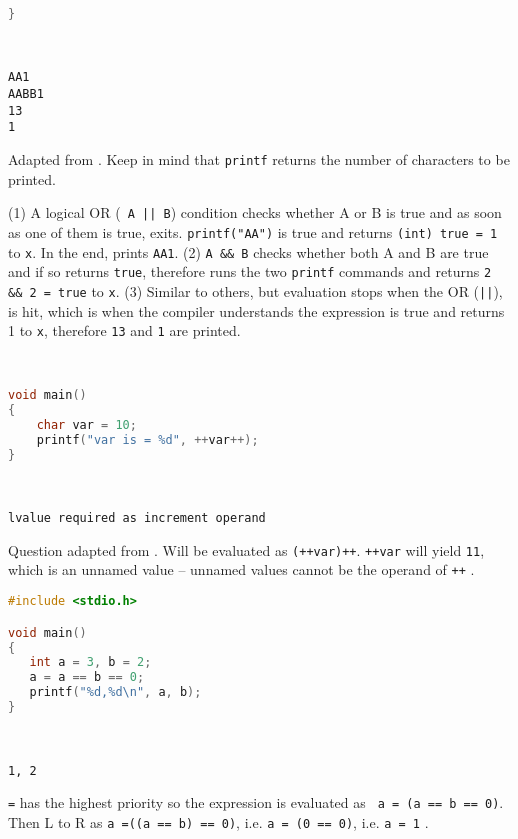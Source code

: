 \documentclass[a4paper]{article}
\begin{document}
\begin{exmp}
\begin{multicols}{2}
\begin{lstlisting}[language=c]
}
\end{lstlisting}


\columnbreak
\; \\
\begin{verbatim}
AA1
AABB1
13
1
\end{verbatim}

Adapted from \cite{aptitudequestions}. Keep in mind that \texttt{printf} returns the number of characters to be printed. 

(1) A logical OR (\texttt{ A || B}) condition checks whether A or B is true and as soon as one of them is true, exits. \texttt{printf("AA")} is true and returns \texttt{(int) true = 1} to \texttt{x}. In the end, prints \texttt{AA1}. (2) \texttt{A \&\& B} checks whether both A and B are true and if so returns \texttt{true}, therefore runs the two \texttt{printf} commands and returns \texttt{2 \&\& 2 = true} to \texttt{x}. (3) Similar to others, but evaluation stops when the OR (\texttt{||}), is hit, which is when the compiler understands the expression is true and returns 1 to \texttt{x}, therefore \texttt{13} and \texttt{1} are printed.
\end{multicols}



\begin{multicols}{2}


\begin{lstlisting}[language=c]


void main()
{   
	char var = 10;
	printf("var is = %d", ++var++);
}

\end{lstlisting}

\columnbreak
\; \\
\begin{verbatim}
lvalue required as increment operand
\end{verbatim}
Question adapted from \cite{aptitudequestions}. Will be evaluated as \texttt{(++var)++}. \texttt{++var} will yield \texttt{11}, which is an unnamed value -- unnamed values cannot be the operand of \texttt{++} \cite{aptitudequestions}.
\end{multicols}

\clearpage
\begin{multicols}{2}
\begin{lstlisting}[language=c]
#include <stdio.h>

void main()
{
   int a = 3, b = 2;
   a = a == b == 0;
   printf("%d,%d\n", a, b);
}
\end{lstlisting}

\columnbreak \; \\
\begin{verbatim}
1, 2
\end{verbatim}
\texttt{=} has the highest priority so the expression is evaluated as \texttt{ a = (a == b == 0)}. Then L to R as \texttt{a =((a == b) == 0)}, i.e. \texttt{a = (0 == 0)}, i.e. \texttt{a = 1} \cite{aptitudequestions}.
\end{multicols}
\end{exmp}
\end{document}

